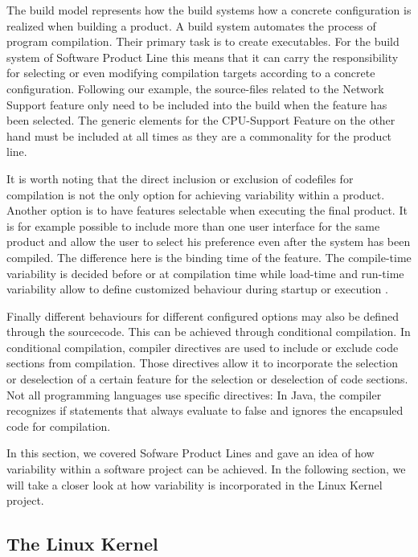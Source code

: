 \documentclass[a4paper]{article}
\begin{document}
The build model represents how the build systems how a concrete configuration is realized when building a product. A build system automates the process of program compilation. Their primary task is to create executables. For the build system of Software Product Line this means that it can carry the responsibility for selecting or even modifying compilation targets according to a concrete configuration. Following our example, the source-files related to the Network Support feature only need to be included into the build when the feature has been selected. The generic elements for the CPU-Support Feature on the other hand must be included at all times as they are a commonality for the product line. 

It is worth noting that the direct inclusion or exclusion of codefiles for compilation is not the only option for achieving variability within a product. Another option is to have features selectable when executing the final product. It is for example possible to include more than one user interface for the same product and allow the user to select his preference even after the system has been compiled. The difference here is the binding time of the feature. The compile-time variability is decided before or at compilation time while load-time and run-time variability allow to define customized behaviour during startup or execution \cite[p.49]{Apel:2013:FSP:2541773}.

Finally different behaviours for different configured options may also be defined through the sourcecode. This can be achieved through conditional compilation. In conditional compilation, compiler directives are used to include or exclude code sections from compilation. Those directives allow it to incorporate the selection or deselection of a certain feature for the selection or deselection of code sections. Not all programming languages use specific directives: In Java, the compiler recognizes if statements that always evaluate to false and ignores the encapsuled code for compilation.

In this section, we covered Sofware Product Lines and gave an idea of how variability within a software project can be achieved. In the following section, we will take a closer look at how variability is incorporated in the Linux Kernel project.

\subsection{The Linux Kernel}\label{linux-kernel}
\end{document}
